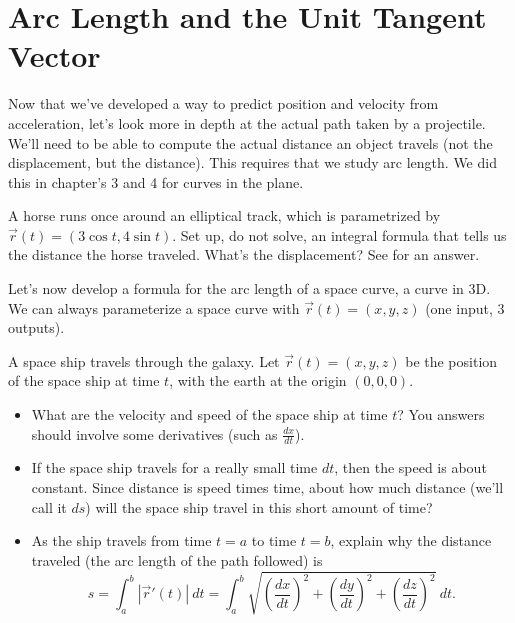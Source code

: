 \section{Arc Length and the Unit Tangent Vector}
Now that we've developed a way to predict position and velocity from acceleration, let's look more in depth at the actual path taken by a projectile. We'll need to be able to compute the actual distance an object travels (not the displacement, but the distance).  This requires that we study arc length.  We did this in chapter's 3 and 4 for curves in the plane.

\begin{review*}
 A horse runs once around an elliptical track, which is parametrized by $\vec r(t) = (3\cos t,4\sin t)$.  Set up, do not solve, an integral formula that tells us the distance the horse traveled. What's the displacement? See 
for an answer.
\end{review*}
 

Let's now develop a formula for the arc length of a space curve, a curve in 3D. We can always parameterize a space curve with $\vec r(t) = (x,y,z)$ (one input, 3 outputs).

\begin{problem}
A space ship travels through the galaxy. Let $\vec r(t) = (x,y,z)$ 
%
be the position of the space ship at time $t$, with the earth at the origin $(0,0,0)$. 
\begin{itemize}
 \item What are the velocity and speed of the space ship at time $t$? You answers should involve some derivatives (such as $\frac{dx}{dt}$).
 \item If the space ship travels for a really small time $dt$, then the speed is about constant. Since distance is speed times time, about how much distance (we'll call it $ds$) will the space ship travel in this short amount of time?
 \item As the ship travels from time $t=a$ to time $t=b$, explain why the distance traveled (the arc length of the path followed) is $$s=\int_a^b |\vec r '(t)|\ dt = \int_a^b \sqrt{\left(\frac{dx}{dt}\right)^2+\left(\frac{dy}{dt}\right)^2+\left(\frac{dz}{dt}\right)^2}\ dt .$$
\end{itemize}

\end{problem}

